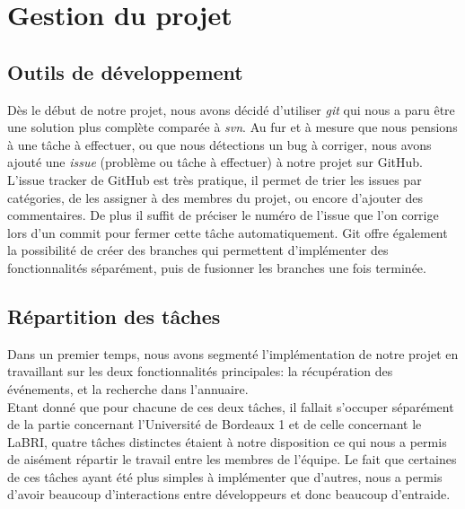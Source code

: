 \chapter{Gestion du projet}

\section{Outils de développement}
Dès le début de notre projet, nous avons décidé d’utiliser \emph{git} qui nous a paru être une solution plus complète comparée à \emph{svn}. Au fur et à mesure que nous pensions à une tâche à effectuer, ou que nous détections un bug à corriger, nous avons ajouté une \emph{issue} (problème ou tâche à effectuer) à notre projet sur GitHub. L’issue tracker de GitHub est très pratique, il permet de trier les issues par catégories, de les assigner à des membres du projet, ou encore d’ajouter des commentaires. De plus il suffit de préciser le numéro de l’issue que l’on corrige lors d’un commit pour fermer cette tâche automatiquement. Git offre également la possibilité de créer des branches qui permettent d’implémenter des fonctionnalités séparément, puis de fusionner les branches une fois terminée.

\section{Répartition des tâches}
Dans un premier temps, nous avons segmenté l’implémentation de notre projet en travaillant sur les deux fonctionnalités principales: la récupération des événements, et la recherche dans l’annuaire. \\
Etant donné que pour chacune de ces deux tâches, il fallait s’occuper séparément de la partie concernant l’Université de Bordeaux 1 et de celle concernant le LaBRI, quatre tâches distinctes étaient à notre disposition ce qui nous a permis de aisément répartir le travail entre les membres de l’équipe. Le fait que certaines de ces tâches ayant été plus simples à implémenter que d’autres, nous a permis d’avoir beaucoup d’interactions entre développeurs et donc beaucoup d’entraide.\\\\

